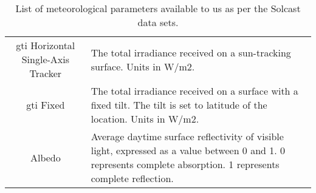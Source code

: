 \begin{table}[H]
\begin{adjustwidth*}{-3.0cm}{-3.0cm}
\begin{tabularx}{\linewidth}{cX}
                        \gls{gti} Horizontal Single-Axis Tracker & The total irradiance received on a sun-tracking surface.  Units in W/m2.                                                                                                                                                                                  \\
                        \gls{gti} Fixed                          & The total irradiance received on a surface with a fixed tilt. The tilt is set to latitude of the location.  Units in W/m2.                                                                                                                                \\
                        Albedo                                   & Average daytime surface reflectivity of visible light, expressed as a value between 0 and 1. 0 represents complete absorption. 1 represents complete reflection.                                                                                          \\
                \end{tabularx}
                \caption{List of meteorological parameters available to us as per the Solcast data sets.}
                \label{tab:Solcast-parameters}
        \end{adjustwidth*}
\end{table}